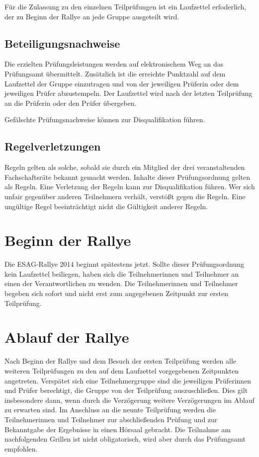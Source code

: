 \documentclass[a4paper,10pt]{article}
\begin{document}
Für die Zulassung zu den einzelnen Teilprüfungen ist ein Laufzettel erfoderlich, 
der zu Beginn der Rallye an jede Gruppe ausgeteilt wird.

\subsection{Beteiligungsnachweise}


Die erzielten Prüfungsleistungen werden auf elektronischem Weg an das
Prüfungsamt übermittelt. Zusätzlich ist die erreichte Punktzahl auf dem 
Laufzettel der Gruppe einzutragen und von der jeweiligen Prüferin oder dem
jeweiligen Prüfer abzustempeln. 
Der Laufzettel wird nach der letzten Teilprüfung an die Prüferin oder den Prüfer 
übergeben.

Gefälschte Prüfungsnachweise können zur Disqualifikation führen.

\subsection{Regelverletzungen}

Regeln gelten als solche, sobald sie durch ein Mitglied der drei 
veranstaltenden Fachschaftsräte bekannt gemacht werden. Inhalte dieser
Prüfungsordnung gelten als Regeln. Eine Verletzung der Regeln kann zur
Disqualifikation führen. Wer sich unfair gegenüber anderen Teilnehmern
verhält, verstößt gegen die Regeln. Eine ungültige Regel beeinträchtigt
nicht die Gültigkeit anderer Regeln.



\section{Beginn der Rallye}

Die ESAG-Rallye 2014 beginnt spätestens jetzt. Sollte dieser Prüfungsordnung
kein Laufzettel beiliegen, haben sich die Teilnehmerinnen und Teilnehmer an 
einen der Verantwortlichen zu wenden. Die Teilnehmerinnen und Teilnehmer
begeben sich sofort und nicht erst zum angegebenen Zeitpunkt zur ersten
Teilprüfung.

\section{Ablauf der Rallye}
Nach Beginn der Rallye und dem Besuch der ersten Teilprüfung werden alle 
weiteren Teilprüfungen zu den auf dem Laufzettel vorgegebenen Zeitpunkten 
angetreten. Verspätet sich eine Teilnehmergruppe sind die jeweiligen Prüferinnen
und Prüfer berechtigt, die Gruppe von der Teilprüfung auszuschließen. Dies 
gilt insbesondere dann, wenn durch die Verzögerung weitere Verzögerungen im 
Ablauf zu erwarten sind. Im Anschluss an die neunte Teilprüfung werden die 
Teilnehmerinnen und Teilnehmer zur abschließenden Prüfung und zur Bekanntgabe 
der Ergebnisse in einen Hörsaal gebracht. Die Teilnahme am nachfolgenden 
Grillen ist nicht obligatorisch, wird aber durch das Prüfungsamt empfohlen.
\end{document}
